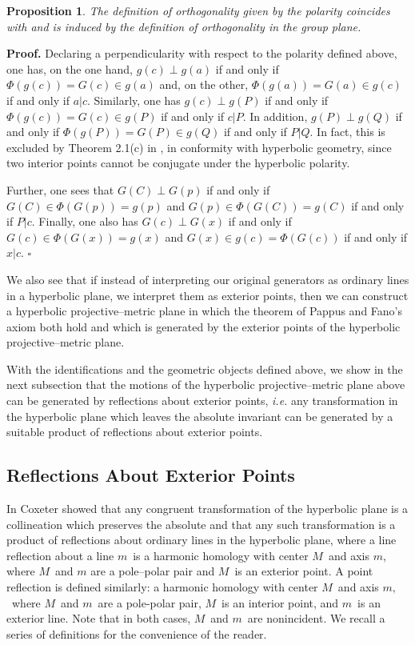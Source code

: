 \documentclass[a4paper,twoside,12pt]{article}
\newtheorem{prop}{Proposition}[section]
\newenvironment{proof}{\medskip \noindent 
            {\bf Proof.}}{ \hfill $\square$ \medskip}
\begin{document}
\begin{prop} The definition of orthogonality given by the polarity
coincides with and is induced by the definition of orthogonality in 
the group plane.
\end{prop}

\begin{proof} Declaring a perpendicularity with respect to the
polarity defined above, one has, on the one hand, $g(c) \perp g(a)$ 
if and only if $\Phi(g(c))= G(c) \in g(a)$ and, on the other, 
$\Phi(g(a))= G(a)\in g(c)$ if and only if $a | c$. Similarly, one has
$g(c) \perp g(P)$ if and only if $\Phi(g(c))= G(c) \in g(P)$ if and
only if $c | P$. In addition, $g(P) \perp g(Q)$ if and only if 
$\Phi(g(P))=G(P)\in g(Q)$ if and only if $P | Q$. In fact, this is
excluded by Theorem 2.1(c) in \cite{BBPW}, in conformity with hyperbolic 
geometry, since two interior points cannot be conjugate under the 
hyperbolic polarity.

     Further, one sees that $G(C) \perp G(p)$ if and only if 
$G(C)\in \Phi(G(p))=g(p)$ and $G(p)\in \Phi(G(C))=g(C)$ if and only if 
$P | c$. Finally, one also has $G(c) \perp G(x)$ if and only if 
$G(c)\in \Phi(G(x))=g(x)$ and $G(x)\in g(c)=\Phi(G(c))$ if and only if
$x | c$.
\end{proof}

     We also see that if instead of interpreting our original
generators as ordinary lines in a hyperbolic plane, we interpret them
as exterior points, then we can construct a hyperbolic
projective--metric plane in which the theorem of Pappus and Fano's
axiom both hold and which is generated by the exterior points of the
hyperbolic projective--metric plane.

     With the identifications and the geometric objects defined above,
we show in the next subsection that the motions of the hyperbolic
projective--metric plane above can be generated by reflections about
exterior points, {\it i.e.} any transformation in the hyperbolic plane
which leaves the absolute invariant can be generated by a suitable
product of reflections about exterior points.

\subsection{Reflections About Exterior Points}

     In \cite{Cox3} Coxeter showed that any congruent
transformation of the hyperbolic plane is a collineation which preserves the
absolute and that any such transformation is a product of reflections about
ordinary lines in the hyperbolic plane, where a line reflection about a line 
$m$\ is a harmonic homology with center $M$\ and axis $m$, where $M$\ and $m$
are a pole--polar pair and $M$\ is an exterior point. A point reflection is
defined similarly: a harmonic homology with center $M$\ and axis $m,$\ where 
$M$\ and $m$\ are a pole-polar pair, $M$\ is an interior point, and $m$\ is
an exterior line. Note that in both cases, $M$\ and $m$\ are nonincident.
We recall a series of definitions for the convenience of the reader.
\end{document}
